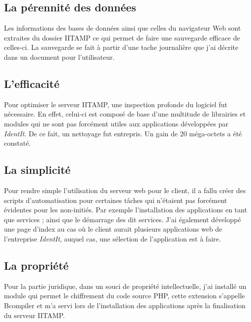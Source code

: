 \subsection{La pérennité des données} %
\label{sub:La pérennité des données}

Les informations des bases de données ainsi que celles du navigateur Web
sont extraites du dossier IITAMP ce qui permet de faire une sauvegarde
efficace de celles-ci. La sauvegarde se fait à partir d'une tache
journalière que j'ai décrite dans un document pour l'utilisateur.

\subsection{L'efficacité} %
\label{sub:L'efficacité}

Pour optimiser le serveur IITAMP, une inspection profonde du logiciel
fut nécessaire. En effet, celui-ci est composé de base d'une multitude
de librairies et modules qui ne sont pas forcément utiles aux
applications développées par \emph{IdentIt}. De ce fait, un nettoyage
fut entrepris. Un gain de 20 méga-octets a été constaté.

\subsection{La simplicité} %
\label{sub:La simplicité}

Pour rendre simple l'utilisation du serveur web pour le client, il a
fallu créer des scripts d'automatisation pour certaines tâches qui
n'étaient pas forcément évidentes pour les non-initiés. Par exemple
l'installation des applications en tant que services ; ainsi que le
démarrage des dit services.  J'ai également développé une page d'index
au cas où le client aurait plusieurs applications web de l'entreprise
\emph{IdentIt}, auquel cas, une sélection de l'application est à faire.

\subsection{La propriété} %
\label{sub:La propriété}

Pour la partie juridique, dans un souci de propriété intellectuelle,
j'ai installé un module qui permet le chiffrement du code source PHP,
cette extension s'appelle Bcompiler et m'a servi lors de l'installation
des applications après la finalisation du serveur IITAMP.

